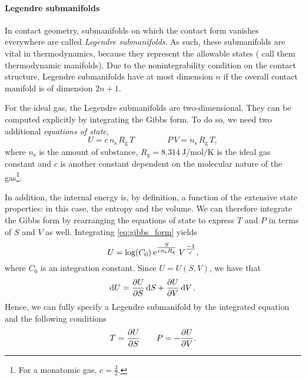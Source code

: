 \paragraph{Legendre submanifolds} In contact geometry, submanifolds on which the contact form vanishes everywhere are called \emph{Legendre submanifolds}. As such, these submanifolds are vital in thermodynamics, because they represent the allowable states (\citet{Balian2001} call them thermodynamic manifolds). Due to the nonintegrability condition on the contact structure, Legendre submanifolds have at most dimension \(n\) if the overall contact manifold is of dimension \(2n + 1\).

For the ideal gas, the Legendre submanifolds are two-dimensional. They can be computed explicitly by integrating the Gibbs form. To do so, we need two additional \emph{equations of state}, 
\begin{equation}
    U = c\, n_\text{s}\, R_\text{g}\, T \qquad \qquad P \, V = n_\text{s} \, R_\text{g} \, T,
\end{equation}
where \(n_\text{s}\) is the amount of substance, \(R_\text{g} = \SI{8.314}{\joule \per \mole \per \kelvin}\) is the ideal gas constant and \(c\) is another constant dependent on the molecular nature of the gas\footnote{For a monatomic gas, \(c = \tfrac{3}{2}\).}. 

In addition, the internal energy is, by definition, a function of the extensive state properties: in this case, the entropy and the volume. We can therefore integrate the Gibbs form by rearranging the equations of state to express \(T\) and \(P\) in terms of \(S\) and \(V\) as well. Integrating \cref{eq:gibbs_form} yields
\begin{equation}
     U = \log(C_0) \: \mathrm{e}^{\tfrac{S}{cn_\text{s}R_\text{g}}} \: V^{\tfrac{-1}{c}},
\end{equation}
where \(C_0\) is an integration constant. Since \( U = U(S, V)\), we have that
\begin{equation}
     \dd{U} = \pdv{U}{S}\dd{S} + \pdv{U}{V}\dd{V}.
\end{equation}
Hence, we can fully specify a Legendre submanifold by the integrated equation and the following conditions
\begin{equation}
     T = \pdv{U}{S} \qquad P = -\pdv{U}{V}.
\end{equation}

